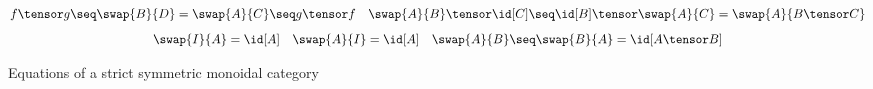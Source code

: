 \begin{figure}
    \begin{gather*}
        f \tensor g \seq \swap{B}{D} = \swap{A}{C} \seq g \tensor f
        \quad
        \swap{A}{B} \tensor \id[C] \seq \id[B] \tensor \swap{A}{C}
        =
        \swap{A}{B \tensor C}
        \\[0.5em]
        \swap{I}{A} = \id[A]
        \quad
        \swap{A}{I} = \id[A]
        \quad
        \swap{A}{B} \seq \swap{B}{A} = \id[A \tensor B]
    \end{gather*}
    \caption{
        Equations of a strict symmetric monoidal category
    }
    \label{fig:smc-equations}
\end{figure}
